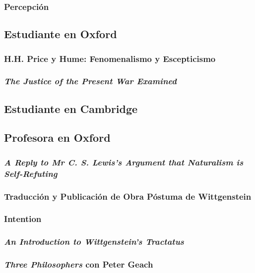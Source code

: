 \documentclass[./main.tex]{subfiles}
\begin{document}
\subsubsection{Percepción}

\subsection{Estudiante en Oxford}

\subsubsection{H.H. Price y Hume: Fenomenalismo y Escepticismo}

\subsubsection{\emph{The Justice of the Present War Examined}}

\subsection{Estudiante en Cambridge}

\subsection{Profesora en Oxford}

\subsubsection{\emph{A Reply to Mr C. S. Lewis's Argument that Naturalism is Self-Refuting}}

\subsubsection{Traducción y Publicación de Obra Póstuma de Wittgenstein}

\subsubsection{Intention}

\subsubsection{\emph{An Introduction to Wittgenstein's Tractatus}}

\subsubsection{\emph{Three Philosophers} con Peter Geach}
\end{document}
